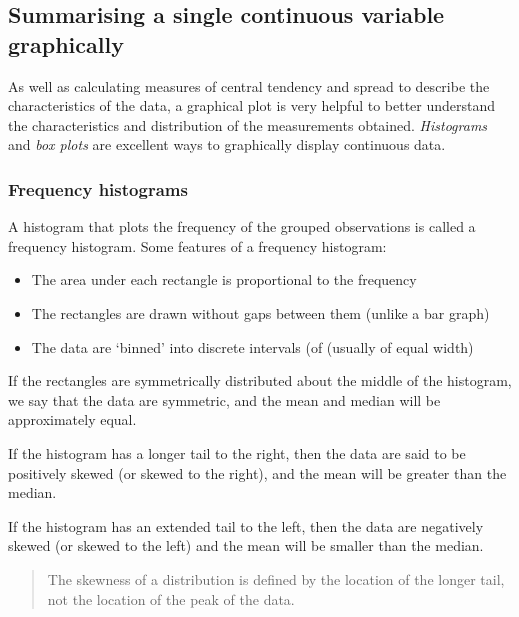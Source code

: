 \documentclass[
  a4paper,
]{memoir}
\providecommand{\tightlist}{%
  \setlength{\itemsep}{0pt}\setlength{\parskip}{0pt}}\usepackage{longtable,booktabs,array}
\begin{document}
\hypertarget{summarising-a-single-continuous-variable-graphically}{%
\subsection{Summarising a single continuous variable
graphically}\label{summarising-a-single-continuous-variable-graphically}}

As well as calculating measures of central tendency and spread to
describe the characteristics of the data, a graphical plot is very
helpful to better understand the characteristics and distribution of the
measurements obtained. \emph{Histograms} and \emph{box plots} are
excellent ways to graphically display continuous data.

\hypertarget{frequency-histograms}{%
\subsubsection{Frequency histograms}\label{frequency-histograms}}

A histogram that plots the frequency of the grouped observations is
called a frequency histogram. Some features of a frequency histogram:

\begin{itemize}
\tightlist
\item
  The area under each rectangle is proportional to the frequency
\item
  The rectangles are drawn without gaps between them (unlike a bar
  graph)
\item
  The data are `binned' into discrete intervals (of (usually of equal
  width)
\end{itemize}

If the rectangles are symmetrically distributed about the middle of the
histogram, we say that the data are symmetric, and the mean and median
will be approximately equal.

If the histogram has a longer tail to the right, then the data are said
to be positively skewed (or skewed to the right), and the mean will be
greater than the median.

If the histogram has an extended tail to the left, then the data are
negatively skewed (or skewed to the left) and the mean will be smaller
than the median.

\begin{quote}
The skewness of a distribution is defined by the location of the longer
tail, not the location of the peak of the data.
\end{quote}
\end{document}
